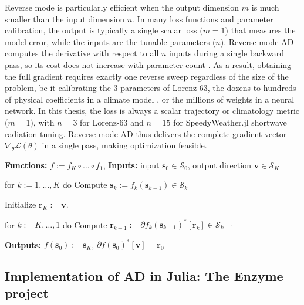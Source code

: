 Reverse mode is particularly efficient when the output dimension $m$ is much smaller than the input dimension $n$. In many loss functions and parameter calibration, the output is typically a single scalar loss ($m=1$) that measures the model error, while the inputs are the tunable parameters ($n$). Reverse-mode AD computes the derivative with respect to all $n$ inputs during a single backward pass, so its cost does not increase with parameter count \parencite{baydin_automatic_2018,blondel_elements_2024}. As a result, obtaining the full gradient requires exactly one reverse sweep regardless of the size of the problem, be it calibrating the 3 parameters of Lorenz-63, the dozens to hundreds of physical coefficients in a climate model \parencite{gelbrecht_differentiable_2023}, or the millions of weights in a neural network. In this thesis, the loss is always a scalar trajectory or climatology metric ($m=1$), with $n=3$ for Lorenz-63 and $n=15$ for SpeedyWeather.jl shortwave radiation tuning. Reverse-mode AD thus delivers the complete gradient vector $\nabla_\theta \mathcal{L}(\theta)$ in a single pass, making optimization feasible.

\begin{algorithm}[H]
\caption{Reverse-mode autodiff, from \textcite{blondel_elements_2024}}
\begin{algorithmic}[1] %
    \Statex \textbf{Functions:} $f := f_K \circ \dots \circ f_1$,
    \Statex \textbf{Inputs:} input $\boldsymbol{s}_0 \in \mathcal{S}_0$, output direction $\boldsymbol{v} \in \mathcal{S}_K$
    
    \State for $k := 1, \dots, K$ do
    \State \quad Compute $\boldsymbol{s}_k := f_k(\boldsymbol{s}_{k-1}) \in \mathcal{S}_k$
    
    \State Initialize $\boldsymbol{r}_K := \boldsymbol{v}$.
    
    \State for $k := K, \dots, 1$ do
    \State \quad Compute $\boldsymbol{r}_{k-1} := \partial f_k(\boldsymbol{s}_{k-1})^*[\boldsymbol{r}_k] \in \mathcal{S}_{k-1}$
    
    \Statex \textbf{Outputs:} $f(\boldsymbol{s}_0) := \boldsymbol{s}_K$, $\partial f(\boldsymbol{s}_0)^*[\boldsymbol{v}] = \boldsymbol{r}_0$
\end{algorithmic}
\end{algorithm}

\subsection{Implementation of AD in Julia: The Enzyme project}

